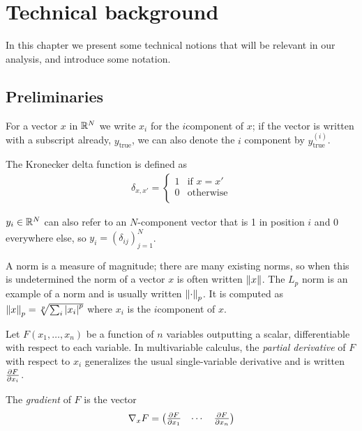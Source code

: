 \documentclass[../main.tex]{subfiles}
\begin{document}
\chapter{Technical background}
\label{ch:background}

In this chapter we present some technical notions that will be relevant in our analysis, and introduce some notation.

\section{Preliminaries}

For a vector $x$ in $\R^N$ we write $x_i$ for the $i$\nth component of $x$; if the vector is written with a subscript already, \eg{} $y_\text{true}$, we can also denote the $i$\nth{} component by $y^{(i)}_\text{true}$.

The Kronecker delta function is defined as
\begin{align*}
\delta_{x, x'} = \begin{cases}
    1 & \text{if } x = x' \\
    0 & \text{otherwise} \\
\end{cases}
\end{align*}

$y_i \in \R^N$ can also refer to an $N$-component vector that is 1 in position $i$ and 0 everywhere else, so $y_i = (\delta_{ij})_{j=1}^N$.

A norm is a measure of magnitude; there are many existing norms, so when this is undetermined the norm of a vector $x$ is often written $\norm{x}$.
The $L_p$ norm is an example of a norm and is usually written $\norm{\cdot}_p$.
It is computed as $\norm{x}_p = \sqrt[p]{\sum_i \abs{x_i}^p}$ where $x_i$ is the $i$\nth component of $x$.

Let $F(x_1, \ldots, x_n)$ be a function of $n$ variables outputting a scalar, differentiable with respect to each variable.
In multivariable calculus, the \emph{partial derivative} of $F$ with respect to $x_i$ generalizes the usual single-variable derivative
and is written $\del{F}{x_i}$.

The \emph{gradient} of $F$ is the vector
\begin{align*}
    \grad{F}{x} =  \begin{pmatrix}
        \del{F}{x_1} & \cdots  & \del{F}{x_n}
    \end{pmatrix}
\end{align*}
\end{document}
